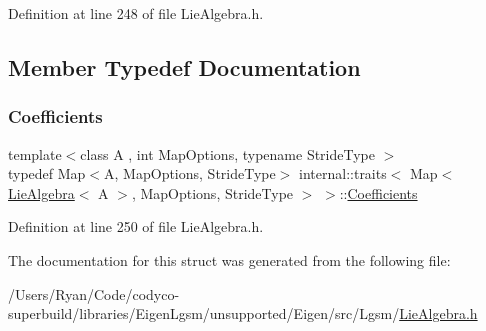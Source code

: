 Definition at line 248 of file Lie\+Algebra.\+h.



\subsection{Member Typedef Documentation}
\hypertarget{structinternal_1_1traits_3_01_map_3_01_lie_algebra_3_01_a_01_4_00_01_map_options_00_01_stride_type_01_4_01_4_a6d5295753fd15f374127373bcab1e504}{}\label{structinternal_1_1traits_3_01_map_3_01_lie_algebra_3_01_a_01_4_00_01_map_options_00_01_stride_type_01_4_01_4_a6d5295753fd15f374127373bcab1e504} 
\subsubsection{\texorpdfstring{Coefficients}{Coefficients}}
{\footnotesize\ttfamily template$<$class A , int Map\+Options, typename Stride\+Type $>$ \\
typedef Map$<$A, Map\+Options, Stride\+Type$>$ internal\+::traits$<$ Map$<$ \hyperlink{class_lie_algebra}{Lie\+Algebra}$<$ A $>$, Map\+Options, Stride\+Type $>$ $>$\+::\hyperlink{structinternal_1_1traits_3_01_map_3_01_lie_algebra_3_01_a_01_4_00_01_map_options_00_01_stride_type_01_4_01_4_a6d5295753fd15f374127373bcab1e504}{Coefficients}}



Definition at line 250 of file Lie\+Algebra.\+h.



The documentation for this struct was generated from the following file\+:\begin{DoxyCompactItemize}
\item 
/\+Users/\+Ryan/\+Code/codyco-\/superbuild/libraries/\+Eigen\+Lgsm/unsupported/\+Eigen/src/\+Lgsm/\hyperlink{_lie_algebra_8h}{Lie\+Algebra.\+h}\end{DoxyCompactItemize}
